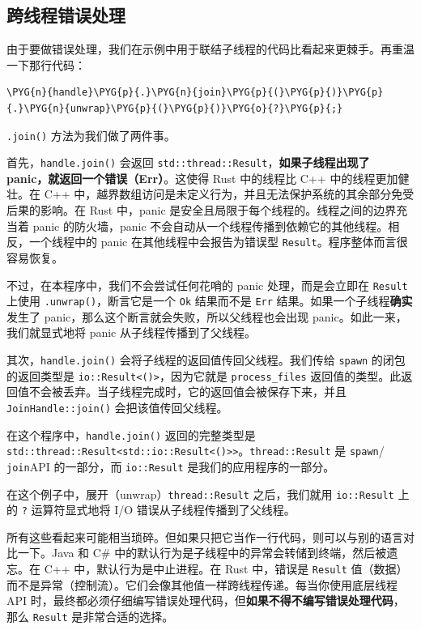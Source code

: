 \subsection{跨线程错误处理}

由于要做错误处理，我们在示例中用于联结子线程的代码比看起来更棘手。再重温一下那行代码：

\begin{Verbatim}[commandchars=\\\{\},breaklines=true,breakanywhere=true,fontsize=\codefont,xleftmargin=17bp]
\PYG{n}{handle}\PYG{p}{.}\PYG{n}{join}\PYG{p}{(}\PYG{p}{)}\PYG{p}{.}\PYG{n}{unwrap}\PYG{p}{(}\PYG{p}{)}\PYG{o}{?}\PYG{p}{;}
\end{Verbatim}

\texttt{.join()} 方法为我们做了两件事。

首先，\texttt{handle.join()} 会返回 \texttt{std::thread::Result}，\textbf{如果子线程出现了 panic，就返回一个错误（Err）}。这使得 Rust 中的线程比 C++ 中的线程更加健壮。在 C++ 中，越界数组访问是未定义行为，并且无法保护系统的其余部分免受后果的影响。在 Rust 中，panic 是安全且局限于每个线程的。线程之间的边界充当着 panic 的防火墙，panic 不会自动从一个线程传播到依赖它的其他线程。相反，一个线程中的 panic 在其他线程中会报告为错误型 \texttt{Result}。程序整体而言很容易恢复。

不过，在本程序中，我们不会尝试任何花哨的 panic 处理，而是会立即在 \texttt{Result} 上使用 \texttt{.unwrap()}，断言它是一个 \texttt{Ok} 结果而不是 \texttt{Err} 结果。如果一个子线程\textbf{确实}发生了 panic，那么这个断言就会失败，所以父线程也会出现 panic。如此一来，我们就显式地将 panic 从子线程传播到了父线程。

其次，\texttt{handle.join()} 会将子线程的返回值传回父线程。我们传给 \texttt{spawn} 的闭包的返回类型是 \texttt{io::Result<()>}，因为它就是 \texttt{process\_files} 返回值的类型。此返回值不会被丢弃。当子线程完成时，它的返回值会被保存下来，并且 \texttt{JoinHandle::join()} 会把该值传回父线程。

在这个程序中，\texttt{handle.join()} 返回的完整类型是 \texttt{std::thread::Result<std::io::Result<()>>}。\texttt{thread::Result} 是 \texttt{spawn}/ \texttt{join}API 的一部分，而 \texttt{io::Result} 是我们的应用程序的一部分。

在这个例子中，展开（unwrap）\texttt{thread::Result} 之后，我们就用 \texttt{io::Result} 上的 \texttt{?} 运算符显式地将 I/O 错误从子线程传播到了父线程。

所有这些看起来可能相当琐碎。但如果只把它当作一行代码，则可以与别的语言对比一下。Java 和 C\# 中的默认行为是子线程中的异常会转储到终端，然后被遗忘。在 C++ 中，默认行为是中止进程。在 Rust 中，错误是 \texttt{Result} 值（数据）而不是异常（控制流）。它们会像其他值一样跨线程传递。每当你使用底层线程 API 时，最终都必须仔细编写错误处理代码，但\textbf{如果不得不编写错误处理代码}，那么 \texttt{Result} 是非常合适的选择。


